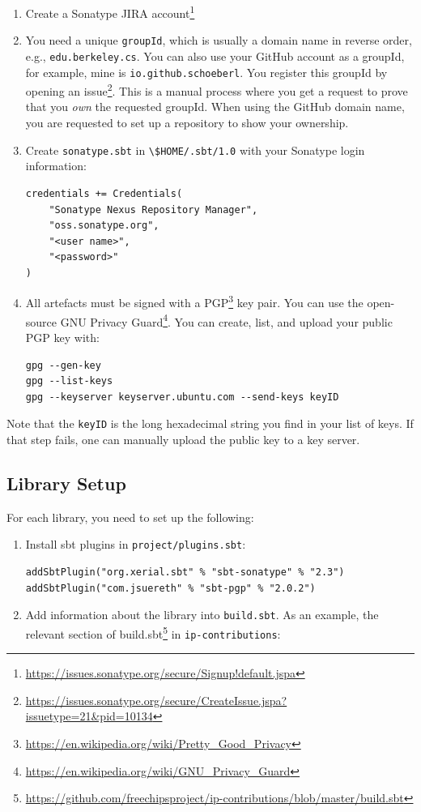 \documentclass[%
    10pt,
    headinclude, footinclude=false,
    openright, %
    notitlepage,
    cleardoublepage=empty,
    headsepline,
    numbers=noenddot,
    bibliography=totoc, index=totoc,
    ]{scrbook}
\newcommand{\code}[1]{{\lstinline[basicstyle=\small\ttfamily]{#1}}}
\newcommand{\myref}[2]{\href{#1}{#2}}
\renewcommand{\myref}[2]{{#2}{\footnote{\url{#1}}}}
\begin{document}
\begin{enumerate}
\item Create a \myref{https://issues.sonatype.org/secure/Signup!default.jspa}{Sonatype JIRA account}
\item You need a unique \code{groupId}, which is usually a domain name in reverse order, e.g., \code{edu.berkeley.cs}.
You can also use your GitHub account as a groupId, for example, mine is \code{io.github.schoeberl}. You register this groupId
by opening an \myref{https://issues.sonatype.org/secure/CreateIssue.jspa?issuetype=21&pid=10134}{issue}.
This is a manual process where you get a request to prove that you \emph{own} the requested groupId.
When using the GitHub domain name, you are requested to set up a repository to show your ownership.
\item Create \code{sonatype.sbt} in \code{\$HOME/.sbt/1.0} with your Sonatype login information:
\begin{verbatim}
credentials += Credentials(
    "Sonatype Nexus Repository Manager",
    "oss.sonatype.org",
    "<user name>",
    "<password>"
)
\end{verbatim}
\item All artefacts must be signed with a \myref{https://en.wikipedia.org/wiki/Pretty_Good_Privacy}{PGP} key pair.
You can use the open-source \myref{https://en.wikipedia.org/wiki/GNU_Privacy_Guard}{GNU Privacy Guard}.
You can create, list, and upload your public PGP key with:
\begin{verbatim}
gpg --gen-key
gpg --list-keys
gpg --keyserver keyserver.ubuntu.com --send-keys keyID
\end{verbatim}
\end{enumerate}

Note that the \code{keyID} is the long hexadecimal string you find in your list of keys.
If that step fails, one can manually upload the public key to a key server.

\subsection{Library Setup}

For each library, you need to set up the following:

\begin{enumerate}
\item Install sbt plugins in \code{project/plugins.sbt}:
\begin{verbatim}
addSbtPlugin("org.xerial.sbt" % "sbt-sonatype" % "2.3")
addSbtPlugin("com.jsuereth" % "sbt-pgp" % "2.0.2")
\end{verbatim}
\item Add information about the library into \code{build.sbt}. As an example,
the relevant section of \myref{https://github.com/freechipsproject/ip-contributions/blob/master/build.sbt}{build.sbt}
in \code{ip-contributions}:
\end{enumerate}
\end{document}
